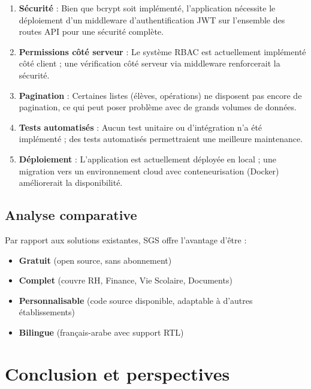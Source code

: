 \documentclass[12pt,a4paper]{report}
\begin{document}
\begin{enumerate}
    \item \textbf{Sécurité} : Bien que bcrypt soit implémenté, l'application nécessite le déploiement d'un middleware d'authentification JWT sur l'ensemble des routes API pour une sécurité complète.

    \item \textbf{Permissions côté serveur} : Le système RBAC est actuellement implémenté côté client ; une vérification côté serveur via middleware renforcerait la sécurité.

    \item \textbf{Pagination} : Certaines listes (élèves, opérations) ne disposent pas encore de pagination, ce qui peut poser problème avec de grands volumes de données.

    \item \textbf{Tests automatisés} : Aucun test unitaire ou d'intégration n'a été implémenté ; des tests automatisés permettraient une meilleure maintenance.

    \item \textbf{Déploiement} : L'application est actuellement déployée en local ; une migration vers un environnement cloud avec conteneurisation (Docker) améliorerait la disponibilité.
\end{enumerate}

\section{Analyse comparative}

Par rapport aux solutions existantes, SGS offre l'avantage d'être :

\begin{itemize}
    \item \textbf{Gratuit} (open source, sans abonnement)
    \item \textbf{Complet} (couvre RH, Finance, Vie Scolaire, Documents)
    \item \textbf{Personnalisable} (code source disponible, adaptable à d'autres établissements)
    \item \textbf{Bilingue} (français-arabe avec support RTL)
\end{itemize}

\chapter{Conclusion et perspectives}
\end{document}
